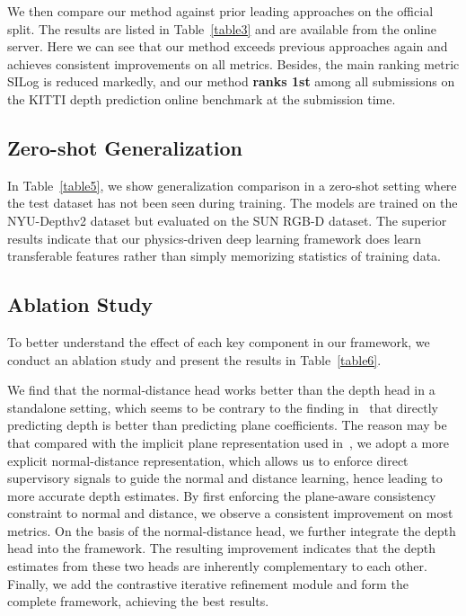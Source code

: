 \documentclass[10pt,twocolumn,letterpaper]{article}
\begin{document}
We then compare our method against prior leading approaches on the official split. The results are listed in Table~\ref{table3} and are available from the online server. Here we can
see that our method exceeds previous approaches again and
achieves consistent improvements on all metrics. Besides, the main ranking metric SILog is reduced markedly, and our method \textbf{ranks 1st} among all submissions on the KITTI depth prediction online benchmark at the submission time.

\subsection{Zero-shot Generalization}

In Table~\ref{table5}, we show generalization comparison in
a zero-shot setting where the test dataset has not been seen
during training. The models are trained on the NYU-Depthv2 dataset but evaluated on the SUN RGB-D dataset. The
superior results indicate that our physics-driven deep learning framework does learn transferable features rather than simply memorizing
statistics of training data.

\subsection{Ablation Study}
To better understand the effect of each key component in our framework, we conduct an ablation study and present the results in Table~\ref{table6}. 


We find that the normal-distance head works better than the depth head in a standalone setting, which seems to be contrary to the finding in~\cite{patil2022p3depth} that directly predicting depth is better than predicting plane coefficients. The reason may be that compared with the implicit plane representation used in~\cite{patil2022p3depth}, we adopt a more explicit normal-distance representation, which allows us to enforce direct supervisory signals to guide the normal and distance learning, hence leading to more accurate depth estimates. By first enforcing the plane-aware consistency constraint to normal and distance, we observe a consistent improvement on most metrics. On the basis of the normal-distance head, we further integrate the depth head into the framework. The resulting improvement indicates that the depth estimates from these two heads are inherently complementary to each other. Finally, we add the contrastive iterative refinement module and form the complete framework, achieving the best results.
\end{document}

